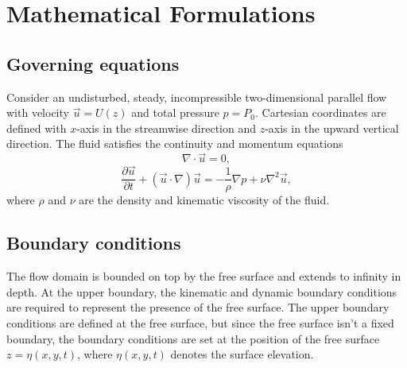 
\chapter{Mathematical Formulations}

\section{Governing equations}
Consider an undisturbed, steady, incompressible two-dimensional parallel flow with velocity $\vec{u}=U({z})$ and total pressure $p=P_0$. Cartesian coordinates are defined with $x$-axis in the streamwise direction and $z$-axis in the upward vertical direction. The fluid satisfies the continuity and momentum equations
\begin{equation}
    \nabla \cdot \vec{u}=0,
    \label{eq:cont}
\end{equation}
\begin{equation}
    \frac{\partial \vec{u}}{\partial t}+\left(\vec{u}\cdot\nabla\right)\vec{u}=-\frac{1}{\rho}\nabla p+\nu\nabla^2\vec{u},
    \label{eq:ns}
\end{equation}
where $\rho$ and $\nu$ are the density and kinematic viscosity of the fluid.

\section{Boundary conditions} \label{ch:bc}
The flow domain is bounded on top by the free surface and extends to infinity in depth. At the upper boundary, the kinematic and dynamic boundary conditions are required to represent the presence of the free surface. The upper boundary conditions are defined at the free surface, but since the free surface isn't a fixed boundary, the boundary conditions are set at the position of the free surface $z=\eta(x,y,t)$, where $\eta(x,y,t)$ denotes the surface elevation. 

